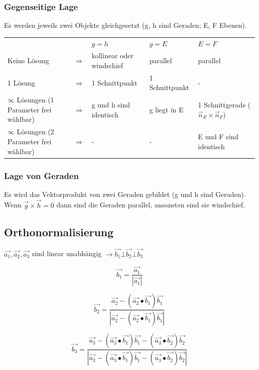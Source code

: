 	\subsubsection{Gegenseitige Lage}
		Es werden jeweils zwei Objekte gleichgesetzt (g, h sind Geraden; E, F
		Ebenen).\\
		\begin{tabular}{lllll}
			&&$g = h$ &$g = E$ &$E = F$\\
			Keine Lösung &$\Rightarrow$ &kollinear oder windschief &parallel
			&parallel\\
			1 Lösung &$\Rightarrow$ &1 Schnittpunkt &1 Schnittpunkt & - \\
			$\infty$ Lösungen (1 Parameter frei wählbar) &$\Rightarrow$ 
			&g und h sind identisch &g liegt in E &1 Schnittgerade ($\vec{n}_E \times \vec{n}_F$) \\
			$\infty$ Lösungen (2 Parameter frei wählbar) &$\Rightarrow$  
			& - & - &E und F sind identisch
		\end{tabular}
		
	\subsubsection{Lage von Geraden}
		Es wird das Vektorprodukt von zwei Geraden gebildet (g und h sind Geraden). \\
		Wenn $\vec{g}\times\vec{h}=0$ dann sind die Geraden parallel, ansonsten sind sie windschief.

\subsection{Orthonormalisierung}
	$\vec{a_1}, \vec{a_2}, \vec{a_3}$ sind linear unabhängig $\longrightarrow \vec{b_1} \bot \vec{b_2} \bot \vec{b_3}$\\
	\begin{minipage}{3cm}
		\begin{equation*}
			\vec{b_1} = \frac{\vec{a_1}}{|\vec{a_1}|}
		\end{equation*}
	\end{minipage}
	\begin{minipage}{5cm}
		\begin{equation*}
			\vec{b_2} = \frac{\vec{a_2} - (\vec{a_2} \bullet \vec{b_1}) \vec{b_1}}{|\vec{a_2} - (\vec{a_2} \bullet \vec{b_1}) \vec{b_1}|}
		\end{equation*}
	\end{minipage}
	\begin{minipage}{5cm}
		\begin{equation*}
			\vec{b_3} = \frac{\vec{a_3} - (\vec{a_3} \bullet \vec{b_1})\vec{b_1} - (\vec{a_3} \bullet \vec{b_2})\vec{b_2}}
					{|\vec{a_3} - (\vec{a_3} \bullet \vec{b_1})\vec{b_1} - (\vec{a_3} \bullet \vec{b_2})\vec{b_2}|}
		\end{equation*}
	\end{minipage} \\ \ \\
	

